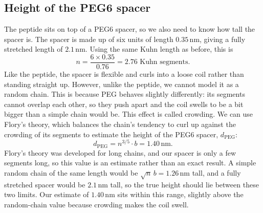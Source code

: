 \documentclass[10pt,a4paper]{article}
\numberwithin{equation}{section}
\newcommand{\nm}{\,\mathrm{nm}}
\newcommand{\dpeg}{d_{\mathrm{PEG}}}
\begin{document}
\subsection*{Height of the PEG6 spacer}
The peptide sits on top of a PEG6 spacer, so we also need to know how tall the spacer is. The spacer is made up of six units of length $0.35\nm$, giving a fully stretched length of $2.1\nm$. Using the same Kuhn length as before, this is
\[
n = \frac{6\times0.35}{0.76} = 2.76 \text{ Kuhn segments.}
\]
Like the peptide, the spacer is flexible and curls into a loose coil rather than standing straight up. However, unlike the peptide, we cannot model it as a random chain. This is because PEG behaves slightly differently: its segments cannot overlap each other, so they push apart and the coil swells to be a bit bigger than a simple chain would be. This effect is called crowding. We can use Flory's theory, which balances the chain's tendency to curl up against the crowding of its segments to estimate the height of the PEG6 spacer, $\dpeg$:
\[
\dpeg = n^{3/5}\cdot b = 1.40\nm.
\]
Flory's theory was developed for long chains, and our spacer is only a few segments long, so this value is an estimate rather than an exact result. A simple random chain of the same length would be $\sqrt{n}\,b = 1.26\nm$ tall, and a fully stretched spacer would be $2.1\nm$ tall, so the true height should lie between these two limits. Our estimate of $1.40\nm$ sits within this range, slightly above the random-chain value because crowding makes the coil swell.
\end{document}
